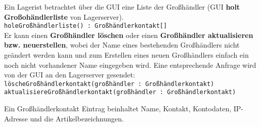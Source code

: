 Ein Lagerist betrachtet über die GUI eine Liste der Großhändler (GUI \textbf{holt Großohändlerliste} von Lagerserver).\\
\medskip
\texttt{holeGroßhändlerliste() : Großhändlerkontakt[]}\\
\medskip
Er kann einen \textbf{Großhändler löschen} oder einen \textbf{Großhändler aktualisieren bzw. neuerstellen}, wobei der Name eines bestehenden Großhändlers nicht geändert werden kann und zum Erstellen eines neuen Großhändlers einfach ein noch nicht vorhandener Name eingegeben wird.
Eine entsprechende Anfrage wird von der GUI an den Lagerserver gesendet:\\
\medskip
\texttt{löscheGroßhändlerkontakt(großhändler : Großhändlerkontakt)} \\
\medskip
\texttt{aktualisiereGroßhändlerkontakt(großhändler : Großhändlerkontakt)}\\
\medskip

Ein Großhändlerkontakt Eintrag beinhaltet Name, Kontakt, Kontodaten, IP-Adresse und die Artikelbezeichnungen.